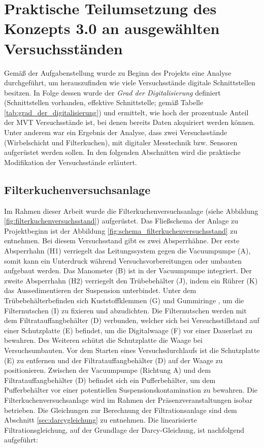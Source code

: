 \section{Praktische Teilumsetzung des Konzepts 3.0 an ausgewählten Versuchsständen}

Gemäß der Aufgabenstellung wurde zu Beginn des Projekts eine Analyse durchgeführt, um herauszufinden wie viele Versuchsstände digitale Schnittstellen besitzen. In Folge dessen wurde der \textit{Grad der Digitalisierung} definiert (Schnittstellen vorhanden, \glqq effektive\grqq{} Schnittstelle; gemäß Tabelle \ref{tab:grad_der_digitalisierung}) und ermittelt, wie hoch der prozentuale Anteil der MVT Versuchsstände ist, bei denen bereits Daten akquiriert werden können. Unter anderem war ein Ergebnis der Analyse, dass zwei Versuchsstände (Wirbelschicht und Filterkuchen), mit digitaler Messtechnik bzw. Sensoren aufgerüstet werden sollen. In den folgenden Abschnitten wird die praktische Modifikation der Versuchsstände erläutert.\\

\subsection{Filterkuchenversuchsanlage}

Im Rahmen dieser Arbeit wurde die Filterkuchenversuchsanlage (siehe Abbildung \ref{fig:filterkuchenversuchsstand})  aufgerüstet. Das Fließschema der Anlage zu Projektbeginn ist der Abbildung \ref{fig:schema_filterkuchenversuchsstand}
zu entnehmen. Bei diesem Versuchsstand gibt es zwei Absperrhähne. Der erste Absperrhahn ({\Hypatia H1}) verriegelt das Leitungssystem gegen die Vacuumpumpe ({\Hypatia A}), somit kann ein Unterdruck während Versuchsvorbereitungen oder umbauten aufgebaut werden. Das Manometer ({\Hypatia B}) ist in der Vacuumpumpe integriert. Der zweite Absperrhahn ({\Hypatia H2}) verriegelt den Trübebehälter ({\Hypatia J}), indem ein Rührer ({\Hypatia K}) das Aussedimentieren der Suspension unterbindet. Unter dem Trübebehälterbefinden sich Kuststoffklemmen ({\Hypatia G}) und Gummiringe , um die Filternutschen ({\Hypatia I}) zu fixieren und abzudichten. Die Filternutschen werden mit dem Filtratauffangbehälter ({\Hypatia D}) verbunden, welcher sich bei Versuchsstillstand auf einer Schutzplatte ({\Hypatia E}) befindet, um die Digitalwaage ({\Hypatia F}) vor einer Dauerlast zu bewahren. Des Weiteren schützt die Schutzplatte die Waage bei Versuchsumbauten. Vor dem Starten eines Versuchsdurchlaufs ist die Schutzplatte ({\Hypatia E}) zu entfernen und der Filtratauffangbehälter ({\Hypatia D}) auf der Waage zu positionieren. Zwischen der Vacuumpumpe (Richtung {\Hypatia A}) und dem Filtratauffangbehälter ({\Hypatia D}) befindet sich ein Pufferbehälter, um dem Pufferbehälter vor einer potentiellen Suspensionskontamination zu bewahren. Die Filterkuchenversuchsanlage wird im Rahmen der Präsenzveranstaltungen isobar betrieben. Die Gleichungen zur Berechnung der Filtrationsanlage sind dem Abschnitt \ref{sec:darcygleichung} zu entnehmen. Die linearisierte Filtrationsgleichung, auf der Grundlage der Darcy-Gleichung, ist nachfolgend aufgeführt:

